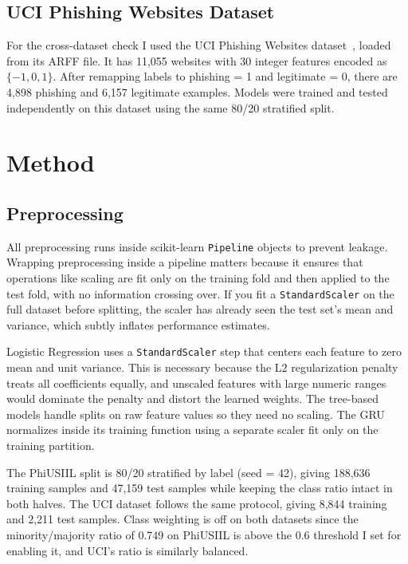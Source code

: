 \documentclass{article}
\begin{document}
\subsection{UCI Phishing Websites Dataset}

For the cross-dataset check I used the UCI Phishing Websites dataset~\cite{uci2015}, loaded from its ARFF file.
It has 11,055 websites with 30 integer features encoded as $\{-1, 0, 1\}$.
After remapping labels to phishing = 1 and legitimate = 0, there are 4,898 phishing and 6,157 legitimate examples.
Models were trained and tested independently on this dataset using the same 80/20 stratified split.

\section{Method}
\label{sec:method}

\subsection{Preprocessing}

All preprocessing runs inside scikit-learn \texttt{Pipeline} objects to prevent leakage.
Wrapping preprocessing inside a pipeline matters because it ensures that operations like scaling are fit only on the training fold and then applied to the test fold, with no information crossing over.
If you fit a \texttt{StandardScaler} on the full dataset before splitting, the scaler has already seen the test set's mean and variance, which subtly inflates performance estimates.

Logistic Regression uses a \texttt{StandardScaler} step that centers each feature to zero mean and unit variance.
This is necessary because the L2 regularization penalty treats all coefficients equally, and unscaled features with large numeric ranges would dominate the penalty and distort the learned weights.
The tree-based models handle splits on raw feature values so they need no scaling.
The GRU normalizes inside its training function using a separate scaler fit only on the training partition.

The PhiUSIIL split is 80/20 stratified by label (seed = 42), giving 188,636 training samples and 47,159 test samples while keeping the class ratio intact in both halves.
The UCI dataset follows the same protocol, giving 8,844 training and 2,211 test samples.
Class weighting is off on both datasets since the minority/majority ratio of 0.749 on PhiUSIIL is above the 0.6 threshold I set for enabling it, and UCI's ratio is similarly balanced.
\end{document}
